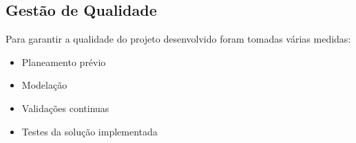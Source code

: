 \subsection*{Gestão de Qualidade}
Para garantir a qualidade do projeto desenvolvido foram tomadas várias medidas:
\begin{itemize}
    \item Planeamento prévio
    \item Modelação
    \item Validações continuas
    \item Testes da solução implementada
\end{itemize}
